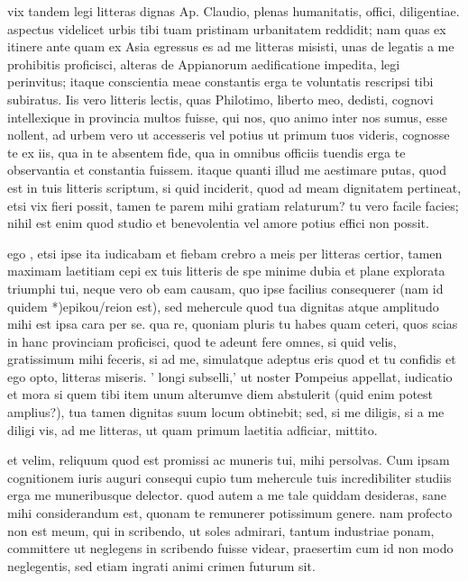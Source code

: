 


 vix tandem legi litteras dignas Ap. Claudio, plenas humanitatis, offici, diligentiae. aspectus videlicet urbis tibi tuam pristinam urbanitatem reddidit; nam quas ex itinere ante quam ex Asia egressus es ad me litteras misisti, unas de legatis a me prohibitis proficisci, alteras de Appianorum aedificatione impedita, legi perinvitus; itaque conscientia meae constantis erga te voluntatis rescripsi tibi subiratus. Iis vero litteris lectis, quas Philotimo, liberto meo, dedisti, cognovi intellexique in provincia multos fuisse, qui nos, quo animo inter nos sumus, esse nollent, ad urbem vero ut accesseris vel potius ut primum tuos videris, cognosse te ex iis, qua in te absentem fide, qua in omnibus officiis tuendis erga te observantia et constantia fuissem. itaque quanti illud me aestimare putas, quod est in tuis litteris scriptum, si quid inciderit, quod ad meam dignitatem pertineat, etsi vix fieri possit, tamen te parem mihi gratiam relaturum? tu vero facile facies; nihil est enim quod studio et benevolentia vel amore potius effici non possit.

 ego , etsi ipse ita iudicabam et fiebam crebro a meis per litteras certior, tamen maximam laetitiam cepi ex tuis litteris de spe minime dubia et plane explorata triumphi tui, neque vero ob eam causam, quo ipse facilius consequerer (nam id quidem *)epikou/reion est), sed mehercule quod tua dignitas atque amplitudo mihi est ipsa cara per se. qua re, quoniam pluris tu habes quam ceteri, quos scias in hanc provinciam proficisci, quod te adeunt fere omnes, si quid velis, gratissimum mihi feceris, si ad me, simulatque adeptus eris quod et tu confidis et ego opto, litteras miseris. ' longi subselli,' ut noster Pompeius appellat, iudicatio et mora si quem tibi item unum alterumve diem abstulerit (quid enim potest amplius?), tua tamen dignitas suum locum obtinebit; sed, si me diligis, si a me diligi vis, ad me litteras, ut quam primum laetitia adficiar, mittito.

 et velim, reliquum quod est promissi ac muneris tui, mihi persolvas. Cum ipsam cognitionem iuris auguri consequi cupio tum mehercule tuis incredibiliter studiis erga me muneribusque delector. quod autem a me tale quiddam desideras, sane mihi considerandum est, quonam te remunerer potissimum genere. nam profecto non est meum, qui in scribendo, ut soles admirari, tantum industriae ponam, committere ut neglegens in scribendo fuisse videar, praesertim cum id non modo neglegentis, sed etiam ingrati animi crimen futurum sit.

